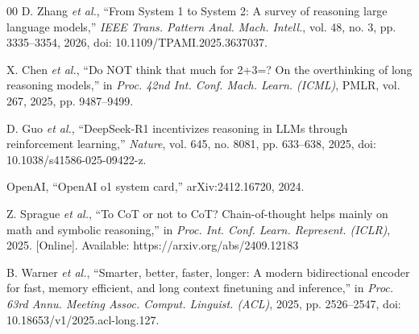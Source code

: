 \begin{thebibliography}{00}
 D. Zhang \emph{et al.}, ``From System 1 to System 2: A survey of reasoning large language models,'' \emph{IEEE Trans. Pattern Anal. Mach. Intell.}, vol. 48, no. 3, pp. 3335--3354, 2026, doi: 10.1109/TPAMI.2025.3637037.

 X. Chen \emph{et al.}, ``Do NOT think that much for 2+3=? On the overthinking of long reasoning models,'' in \emph{Proc. 42nd Int. Conf. Mach. Learn. (ICML)}, PMLR, vol. 267, 2025, pp. 9487--9499.

 D. Guo \emph{et al.}, ``DeepSeek-R1 incentivizes reasoning in LLMs through reinforcement learning,'' \emph{Nature}, vol. 645, no. 8081, pp. 633--638, 2025, doi: 10.1038/s41586-025-09422-z.

 OpenAI, ``OpenAI o1 system card,'' arXiv:2412.16720, 2024.

 Z. Sprague \emph{et al.}, ``To CoT or not to CoT? Chain-of-thought helps mainly on math and symbolic reasoning,'' in \emph{Proc. Int. Conf. Learn. Represent. (ICLR)}, 2025. [Online]. Available: https://arxiv.org/abs/2409.12183


 B. Warner \emph{et al.}, ``Smarter, better, faster, longer: A modern bidirectional encoder for fast, memory efficient, and long context finetuning and inference,'' in \emph{Proc. 63rd Annu. Meeting Assoc. Comput. Linguist. (ACL)}, 2025, pp. 2526--2547, doi: 10.18653/v1/2025.acl-long.127.


\end{thebibliography}
